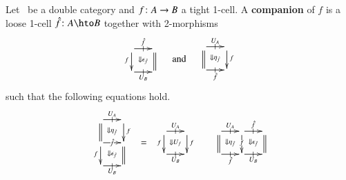 \begin{defn}\label{def:companion}
  Let \lD\ be a double category and $f\colon A\to B$ a tight
  1-cell.  A \textbf{companion} of $f$ is a loose 1-cell
  $\fhat\maps A\hto B$ together with 2-morphisms
  \begin{equation*}
    \begin{array}{c}
      \xymatrix@-.5pc{
        \ar[r]|-@{|}^-{\fhat} \ar[d]_f \ar@{}[dr]|{\Downarrow \epsilon_{\hat{f}} }
        & \ar@{=}[d]\\
        \ar[r]|-@{|}_-{U_B} & }
    \end{array}\quad\text{and}\quad
    \begin{array}{c}
      \xymatrix@-.5pc{
        \ar[r]|-@{|}^-{U_A} \ar@{=}[d] \ar@{}[dr]|{\Downarrow \eta_{\hat{f}}}
        & \ar[d]^f\\
        \ar[r]|-@{|}_-{\fhat} & }
    \end{array}
  \end{equation*}
  such that the following equations hold.
  \begin{align}\label{eq:compeqn}
    \begin{array}{c}
      \xymatrix@-.5pc{
        \ar[r]|-@{|}^-{U_A} \ar@{=}[d] \ar@{}[dr]|{\Downarrow \eta_{\hat{f}}}
        & \ar[d]^f\\
        \ar[r]|-{\fhat} \ar[d]_f \ar@{}[dr]|
        {\Downarrow  \epsilon_{\hat{f}} }
        & \ar@{=}[d]\\
        \ar[r]|-@{|}_-{U_B} & }
    \end{array} &= 
    \begin{array}{c}
      \xymatrix@-.5pc{ \ar[r]|-@{|}^-{U_A} \ar[d]_f
        \ar@{}[dr]|{\Downarrow U_f} &  \ar[d]^f\\
        \ar[r]|-@{|}_-{U_B} & }
    \end{array}
    &
    \begin{array}{c}
      \xymatrix@-.5pc{
        \ar[r]|-@{|}^-{U_A} \ar@{=}[d] \ar@{}[dr]|{ \Downarrow \eta_{\hat{f}}}&
        \ar[r]|-@{|}^{\fhat}\ar[d]|f \ar@{}[dr]|{\Downarrow  \epsilon_{\hat{f}} }
        & \ar@{=}[d]\\
        \ar[r]|-@{|}_-{\fhat} &
        \ar[r]|-@{|}_-{U_B} &}

\end{array}
\end{align}
\end{defn}
